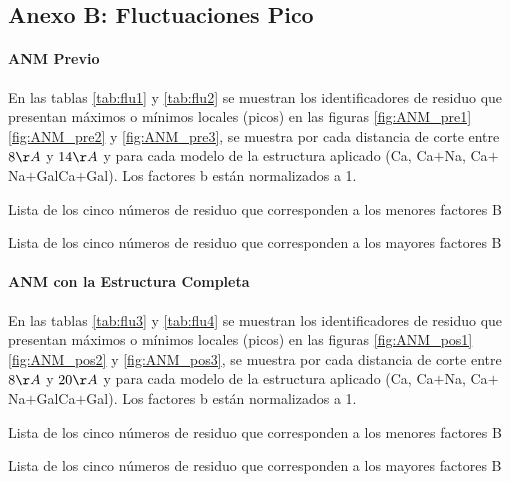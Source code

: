 \begin{appendix}
\chapter{Anexo B: Fluctuaciones Pico}\label{AnexoB}
\subsubsection{ANM Previo}
En las tablas \ref{tab:flu1} y \ref{tab:flu2} se muestran los identificadores de residuo que presentan m\'{a}ximos o m\'{i}nimos locales (picos) en las figuras \ref{fig:ANM_pre1} \ref{fig:ANM_pre2} y \ref{fig:ANM_pre3}, se muestra por cada distancia de corte entre $8\AA$ y $14\AA$ y para cada modelo de la estructura aplicado (Ca, Ca$+$Na, Ca$+$Na$+$GalCa$+$Gal). Los factores b est\'{a}n normalizados a 1. \\
\begin{table}[ht]
\centering
\begin{adjustbox}{width=1.0\textwidth,center}
 
 \end{adjustbox}
 \caption{Lista de los cinco n\'{u}meros de residuo que corresponden a los menores factores B}\label{tab:flu1}
\end{table}
\begin{table}[H]
\centering
\begin{adjustbox}{width=1.0\textwidth,center}
 
 \end{adjustbox}
  \caption{Lista de los cinco n\'{u}meros de residuo que corresponden a los mayores factores B}\label{tab:flu2}
\end{table}
\subsubsection{ANM con la Estructura Completa}
En las tablas \ref{tab:flu3} y \ref{tab:flu4} se muestran los identificadores de residuo que presentan m\'{a}ximos o m\'{i}nimos locales (picos) en las figuras \ref{fig:ANM_pos1} \ref{fig:ANM_pos2} y \ref{fig:ANM_pos3}, se muestra por cada distancia de corte entre $8\AA$ y $20\AA$ y para cada modelo de la estructura aplicado (Ca, Ca$+$Na, Ca$+$Na$+$GalCa$+$Gal). Los factores b est\'{a}n normalizados a 1. \\
\begin{table}[ht]
\centering
\begin{adjustbox}{width=1.0\textwidth,center}
 
 \end{adjustbox}
 \caption{Lista de los cinco n\'{u}meros de residuo que corresponden a los menores factores B}\label{tab:flu3}
\end{table}
\begin{table}[H]
\centering
\begin{adjustbox}{width=1.0\textwidth,center}
 
 \end{adjustbox}
  \caption{Lista de los cinco n\'{u}meros de residuo que corresponden a los mayores factores B}\label{tab:flu4}
\end{table}

\end{appendix}
